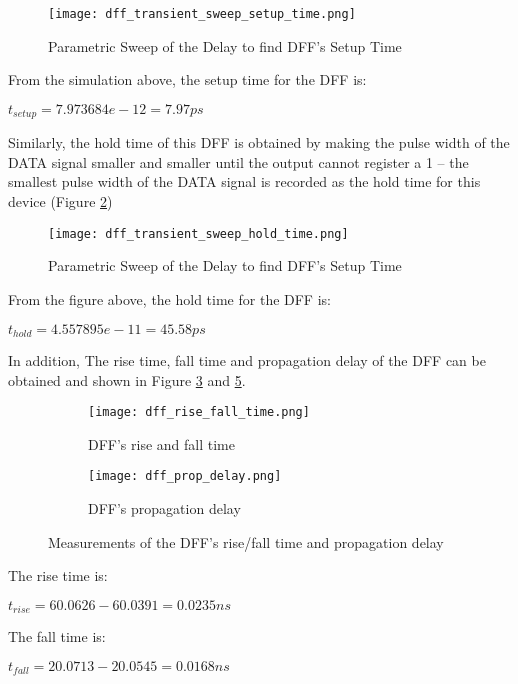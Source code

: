 \documentclass[letterpaper, 11pt]{article}
\begin{document}
\begin{figure}[htb!]
	\centering
	\texttt{[image: dff\_transient\_sweep\_setup\_time.png]}
	\caption{Parametric Sweep of the Delay to find DFF's Setup Time}
	\label{fig5}
\end{figure}

From the simulation above, the setup time for the DFF is:

$t_{setup} = 7.973684e-12 = 7.97ps$

Similarly, the hold time of this DFF is obtained by making the pulse width of the DATA signal smaller and smaller until the output cannot register a 1 -- the smallest pulse width of the DATA signal is recorded as the hold time for this device (Figure \ref{fig6})

\begin{figure}[htb!]
	\centering
	\texttt{[image: dff\_transient\_sweep\_hold\_time.png]}
	\caption{Parametric Sweep of the Delay to find DFF's Setup Time}
	\label{fig6}
\end{figure}

From the figure above, the hold time for the DFF is:

$t_{hold} = 4.557895e-11 = 45.58ps$

In addition, The rise time, fall time and propagation delay of the DFF can be obtained and shown in Figure \ref{fig7a} and \ref{fig7b}.

\begin{figure}[ht!]
	\centering
	\begin{subfigure}[b]{.95\linewidth}
		\texttt{[image: dff\_rise\_fall\_time.png]}
		\caption{DFF's rise and fall time}
		\label{fig7a}
	\end{subfigure}
	\begin{subfigure}[b]{.95\linewidth}
		\texttt{[image: dff\_prop\_delay.png]}
		\caption{DFF's propagation delay}
		\label{fig7b}
	\end{subfigure}
	\caption{Measurements of the DFF's rise/fall time and propagation delay}
\end{figure}

The rise time is:

$t_{rise} = 60.0626-60.0391 = 0.0235ns$

The fall time is: 

$t_{fall} = 20.0713-20.0545 = 0.0168ns$
\end{document}

